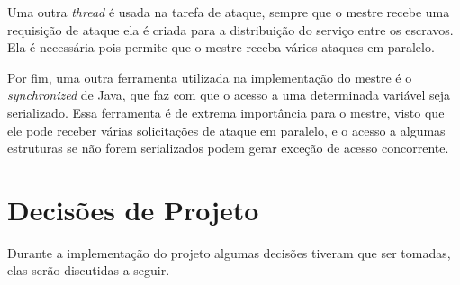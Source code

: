 \documentclass[
	12pt,				%
    oneside,			%
	a4paper,			%
	english,			%
	brazil,				%
	]{abntex2}
\begin{document}
Uma outra \textit{thread} é usada na tarefa de ataque, sempre que o mestre recebe uma requisição de ataque ela é criada para 
a distribuição do serviço entre os escravos. Ela é necessária pois permite que o mestre receba vários ataques em paralelo.

Por fim, uma outra ferramenta utilizada na implementação do mestre é o \textit{synchronized} de Java, que faz com que o acesso
a uma determinada variável seja serializado. Essa ferramenta é de extrema importância para o mestre, visto que ele pode
receber várias solicitações de ataque em paralelo, e o acesso a algumas estruturas se não forem serializados podem gerar
exceção de acesso concorrente.

\section{Decisões de Projeto}
Durante a implementação do projeto algumas decisões tiveram que ser tomadas, elas serão discutidas a seguir.
\end{document}
